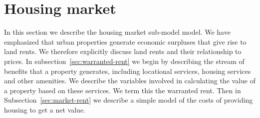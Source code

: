 








\section{Housing market} \label{section-rent}
In this section we describe the housing market sub-model model. %
We have emphasized that urban properties generate economic surpluses that give rise to land rents. We therefore explicitly discuss land rents and their relationship to prices. In subsection~\ref{sec:warranted-rent} we begin by describing the stream of benefits that a property generates, including locational services, housing services and other amenities.  We describe the variables involved in calculating the value of a property based on these services. We term this the \gls{warranted rent}. Then in Subsection~\ref{sec:market-rent} we describe a simple model of the costs of providing housing to get a net value. 

